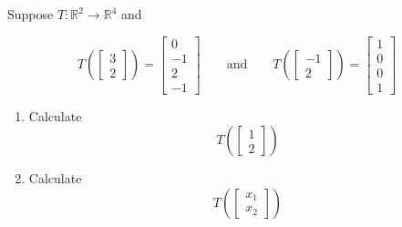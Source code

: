 \documentclass[11pt]{article}
\begin{document}
\pagebreak

Suppose $T:\mathbb{R}^2\to\mathbb{R}^4$ and

\begin{displaymath}
T\left(\left[ \begin{array}{r} 3 \\ 2 \end{array}\right]\right) = 
\left[ \begin{array}{r} 0 \\ -1 \\ 2 \\ -1 \end{array}\right]
\quad\quad\textrm{and}\quad\quad
T\left(\left[ \begin{array}{r} -1 \\ 2 \end{array}\right]\right) = 
\left[ \begin{array}{r} 1 \\ 0 \\ 0 \\ 1 \end{array}\right]
\end{displaymath}

\vspace{0.2in}
\begin{enumerate}
	\item {Calculate 
		\begin{displaymath}
		T\left(\left[ \begin{array}{r} 1 \\ 2 \end{array}\right]\right)
		\end{displaymath}
	}
	\item {Calculate 
		\begin{displaymath}
		T\left(\left[ \begin{array}{r} x_1 \\ x_2 \end{array}\right]\right)
		\end{displaymath}
	}
\end{enumerate}
\end{document}
